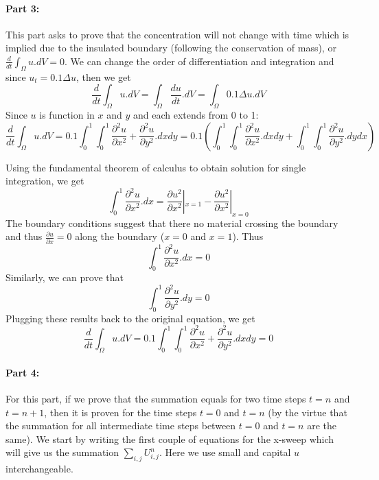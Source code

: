\paragraph{Part 3:}
This part asks to prove that the concentration will not change with time which is implied due to the insulated boundary (following the conservation of mass), or $\frac{d}{dt} \int_{\Omega} u.dV=0$. We can change the order of differentiation and integration and since $u_{t}=0.1\Delta u$, then we get
$$
\frac{d}{dt} \int_{\Omega} u.dV= \int_{\Omega} \frac{d u}{dt}.dV  = \int_{\Omega} 0.1\Delta u.dV
$$
Since $u$  is function in $x$ and $y$ and each extends from 0 to 1:
$$
\frac{d}{dt} \int_{\Omega} u.dV =  0.1 \int_{0}^{1}\int_{0}^{1}\frac{\partial^{2}u}{\partial x^{2}} + \frac{\partial^{2}u}{\partial y^{2}}.dxdy  = 0.1 (\int_{0}^{1}\int_{0}^{1}\frac{\partial^{2}u}{\partial x^{2}}.dxdy + \int_{0}^{1}\int_{0}^{1}\frac{\partial^{2}u}{\partial y^{2}} .dydx)
$$

Using the fundamental theorem of calculus to obtain solution for single integration, we get 
$$
\int_{0}^{1}\frac{\partial^{2}u}{\partial x^{2}}.dx = \frac{\partial u^2}{\partial x^2}|_{x=1} - \frac{\partial u^2}{\partial x^2}|_{x=0}
$$
The boundary conditions suggest that there no material crossing the boundary and thus $\frac{\partial u}{\partial x}=0$ along the boundary ($x=0$ and $x=1$). Thus 
$$
\int_{0}^{1}\frac{\partial^{2}u}{\partial x^{2}}.dx = 0
$$
Similarly, we can prove that
$$
\int_{0}^{1}\frac{\partial^{2}u}{\partial y^{2}}.dy = 0
$$
Plugging these results back to the original equation, we get
$$
\frac{d}{dt} \int_{\Omega} u.dV =  0.1 \int_{0}^{1}\int_{0}^{1}\frac{\partial^{2}u}{\partial x^{2}} + \frac{\partial^{2}u}{\partial y^{2}}.dxdy = 0
$$

\paragraph{Part 4:}
For this part, if we prove that the summation equals for two time steps $t=n$ and $t=n+1$, then it is proven for the time steps $t=0$ and $t=n$ (by the virtue that the summation for all intermediate time steps between $t=0$ and $t=n$ are the same). We start by writing the first couple of equations for the x-sweep which will give us the summation $\sum_{i,j}U_{i,j}^{n}$. Here we use small and capital $u$ interchangeable.

